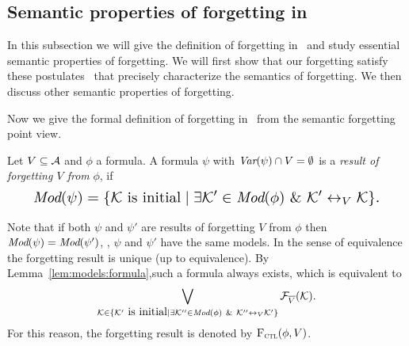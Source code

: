 \documentclass{article}
\begin{document}
\subsection{Semantic properties of forgetting in \CTL}
In this subsection we will give the definition of forgetting in \CTL\ and study essential semantic properties of forgetting.
 We will first show that our forgetting satisfy these postulates~\cite{Yan:AIJ:2009} that precisely characterize the semantics of forgetting. We then discuss other semantic properties of forgetting.

Now we give the formal definition of forgetting in \CTL\ from the semantic forgetting point view.
\begin{definition}[Forgetting]\label{def:V:forgetting}
  Let $V\subseteq\cal A$ and $\phi$ a formula.
A formula $\psi$ with $\textit{Var}(\psi)\cap V=\emptyset$
is a {\em result of forgetting $V$ from} $\phi$, if
\begin{equation}
\resizebox{.91\linewidth}{!}{$
\displaystyle
  \Mod(\psi)=\{{\cal K}\mbox{ is initial}\mid \exists {\cal K}'\in\Mod(\phi)\ \&\ {\cal K}'\lrto_V{\cal K}\}.
  $}
\end{equation}
\end{definition}
Note that if both $\psi$ and $\psi'$ are results of forgetting $V$ from $\phi$ then
$\textit{Mod}(\psi)=\textit{Mod}(\psi')$, \ie, $\psi$ and $\psi'$ have the same models. In the sense
of equivalence the forgetting result is unique (up to equivalence).
By Lemma~\ref{lem:models:formula},such a formula always exists, which
is equivalent to
\begin{equation*}
  \bigvee_{{\cal K}\in  \{{\cal K}'\mbox{ is initial}\mid \exists {\cal K}''\in\textit{Mod}(\phi)\ \&\ {\cal K}''\leftrightarrow_V{\cal K}'\}} {\cal F}_{\overline V}({\cal K}).
\end{equation*}
For this reason, the forgetting result is denoted by ${\textsc{F}_{\textsc{ctl}}}(\phi,V)$.


\end{document}
